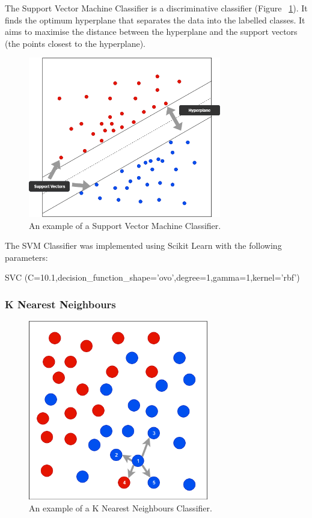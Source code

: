 The Support Vector Machine Classifier is a discriminative classifier (Figure ~\ref{fig:svm}). It finds the optimum hyperplane that separates the data into the labelled classes. It aims to maximise the distance between the hyperplane and the support vectors (the points closest to the hyperplane).

\begin{figure}[h!]
\centering
\includegraphics[width=0.75\textwidth]{design_and_methodology/svm.png}
\caption{\label{fig:svm} An example of a Support Vector Machine Classifier.}
\end{figure}

The SVM Classifier was implemented using Scikit Learn with the following parameters:

\begin{tcolorbox}
\begin{center}
	SVC (C=10.1,decision\_function\_shape='ovo',degree=1,gamma=1,kernel='rbf')
\end{center}
\end{tcolorbox}

\subsubsection*{K Nearest Neighbours}

\begin{figure}[h!]
\centering
\includegraphics[width=0.7\textwidth]{design_and_methodology/knn.png}
\caption{\label{fig:knn} An example of a K Nearest Neighbours Classifier.}
\end{figure}

